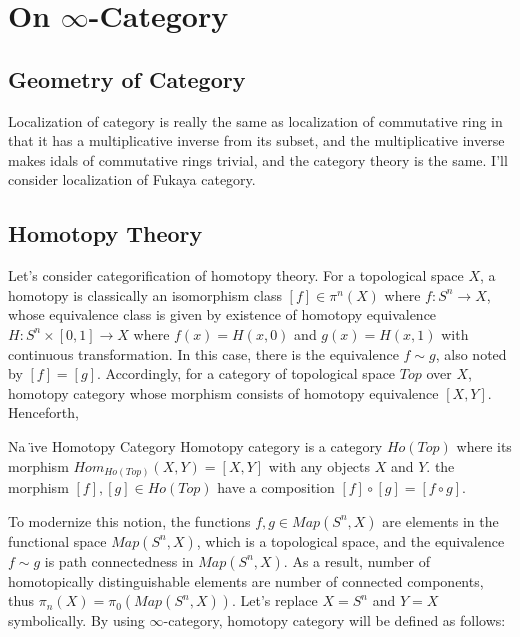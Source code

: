 \documentclass{article}
\begin{document}
\section{On $\infty$-Category}


\subsection{Geometry of Category}

Localization of category is really the same as localization of commutative ring in that it has a multiplicative inverse from its subset,
and the multiplicative inverse makes idals of commutative rings trivial, and the category theory is the same.
I'll consider localization of Fukaya category.



\subsection{Homotopy Theory}

\noindent
Let's consider categorification of homotopy theory.
For a topological space $X$, a homotopy is classically an isomorphism class $[f]\in \pi^n (X)$ where $f:S^n \to X$,
whose equivalence class is given by existence of homotopy equivalence $H: S^n\times [0,1] \to X$
where $f(x) = H(x,0)$ and $g(x) = H(x,1)$ with continuous transformation. 
In this case, there is the equivalence $f\sim g$, also noted by $[f]=[g]$.
Accordingly, for a category of topological space $Top$ over $X$, homotopy category whose morphism consists of homotopy equivalence $[X,Y]$.
Henceforth, \\

\begin{definition} {Na \"{\i}ve Homotopy Category}{}
Homotopy category is a category $Ho(Top)$ where its morphism $Hom_{Ho(Top)}(X,Y) = [X,Y]$ with any objects $X$ and $Y$.
the morphism $[f],[g]\in Ho(Top)$ have a composition $[f]\circ [g] = [f\circ g]$.
\end{definition}


\noindent
To modernize this notion, the functions $f,g\in Map(S^n, X)$ are elements in the functional space $Map(S^n,X)$, which is a topological space,
and the equivalence $f\sim g$ is path connectedness in $Map(S^n,X)$.
As a result, number of homotopically distinguishable elements are number of connected components, thus $\pi_n(X) = \pi_0 (Map(S^n, X))$.
Let's replace $X=S^n$ and $Y=X$ symbolically. By using $\infty$-category, homotopy category will be defined as follows: \\
\end{document}
